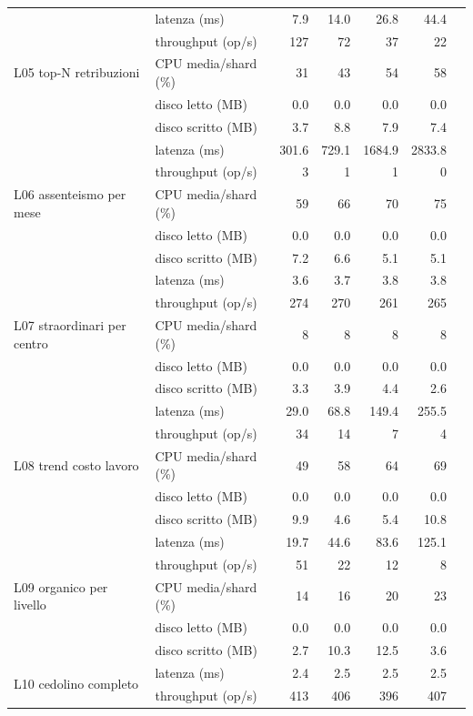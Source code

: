 \begin{longtable}{@{}llrrrrr@{}}
\multirow{5}{*}{L05 top-N retribuzioni} & latenza (ms)      & 7.9 & 14.0 & 26.8 & 44.4 \\
 & throughput (op/s)  & 127 & 72 & 37 & 22 \\
 & CPU media/shard (\%) & 31 & 43 & 54 & 58 \\
 & disco letto (MB)   & 0.0 & 0.0 & 0.0 & 0.0 \\
 & disco scritto (MB) & 3.7 & 8.8 & 7.9 & 7.4 \\ \midrule
\multirow{5}{*}{L06 assenteismo per mese} & latenza (ms)      & 301.6 & 729.1 & 1684.9 & 2833.8 \\
 & throughput (op/s)  & 3 & 1 & 1 & 0 \\
 & CPU media/shard (\%) & 59 & 66 & 70 & 75 \\
 & disco letto (MB)   & 0.0 & 0.0 & 0.0 & 0.0 \\
 & disco scritto (MB) & 7.2 & 6.6 & 5.1 & 5.1 \\ \midrule
\multirow{5}{*}{L07 straordinari per centro} & latenza (ms)      & 3.6 & 3.7 & 3.8 & 3.8 \\
 & throughput (op/s)  & 274 & 270 & 261 & 265 \\
 & CPU media/shard (\%) & 8 & 8 & 8 & 8 \\
 & disco letto (MB)   & 0.0 & 0.0 & 0.0 & 0.0 \\
 & disco scritto (MB) & 3.3 & 3.9 & 4.4 & 2.6 \\ \midrule
\multirow{5}{*}{L08 trend costo lavoro} & latenza (ms)      & 29.0 & 68.8 & 149.4 & 255.5 \\
 & throughput (op/s)  & 34 & 14 & 7 & 4 \\
 & CPU media/shard (\%) & 49 & 58 & 64 & 69 \\
 & disco letto (MB)   & 0.0 & 0.0 & 0.0 & 0.0 \\
 & disco scritto (MB) & 9.9 & 4.6 & 5.4 & 10.8 \\ \midrule
\multirow{5}{*}{L09 organico per livello} & latenza (ms)      & 19.7 & 44.6 & 83.6 & 125.1 \\
 & throughput (op/s)  & 51 & 22 & 12 & 8 \\
 & CPU media/shard (\%) & 14 & 16 & 20 & 23 \\
 & disco letto (MB)   & 0.0 & 0.0 & 0.0 & 0.0 \\
 & disco scritto (MB) & 2.7 & 10.3 & 12.5 & 3.6 \\ \midrule
\multirow{5}{*}{L10 cedolino completo} & latenza (ms)      & 2.4 & 2.5 & 2.5 & 2.5 \\
 & throughput (op/s)  & 413 & 406 & 396 & 407 \\

\end{longtable}
